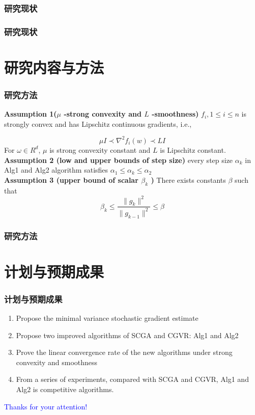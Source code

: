 \documentclass{beamer}
\begin{document}
\begin{frame}
	\frametitle{研究现状} 
    
\end{frame}

\begin{frame}
	\frametitle{研究现状} 

\end{frame}

\section{研究内容与方法}

\begin{frame}
		\frametitle{研究方法} 
	\textbf{Assumption 1($\mu$ -strong convexity and $L$  -smoothness)}  $f_i,1 \leq i \leq n$ is strongly convex and has Lipschitz continuous gradients, i.e.,
	
	\begin{equation}
		\mu I \prec \nabla^2 f_i(w)\prec LI 
		\label{4:assumptinon_1}
	\end{equation}
	For $\omega \in R^d$, $\mu$ is strong convexity constant and $L$ is Lipschitz constant.\\
	\textbf{Assumption 2 (low and upper bounds of step size)} every step size $\alpha_k$  in Alg1 and Alg2 algorithm satisfies  $\alpha_1 \leq \alpha_k \leq \alpha_2$\\
	\textbf{Assumption 3 (upper bound of scalar $\beta_k$ )} There exists constants $\beta$  such that 
	\begin{equation}
		\beta_k \leq \frac{\|g_k\|^2}{\|g_{k-1}\|^2} \leq \beta
		\label{4:assumption_3}
	\end{equation} 
\end{frame}

\begin{frame}
	\frametitle{研究方法} 

\end{frame}

\section{计划与预期成果}
\begin{frame}
	\frametitle{计划与预期成果} 
			    \begin{enumerate}[(1)]
		\item Propose the minimal variance stochastic gradient estimate \\
	\item Propose two improved algorithms of SCGA and CGVR: Alg1 and Alg2
	\item Prove the linear convergence rate of the new algorithms under strong convexity and smoothness
	\item From a series of experiments, compared with SCGA and CGVR, Alg1 and Alg2 is competitive algorithms.
\end{enumerate}
\end{frame}
\begin{frame}
\vspace{1em}
\centering
\textcolor{blue}{\LARGE Thanks for your attention!}

\end{frame}
\end{document}

